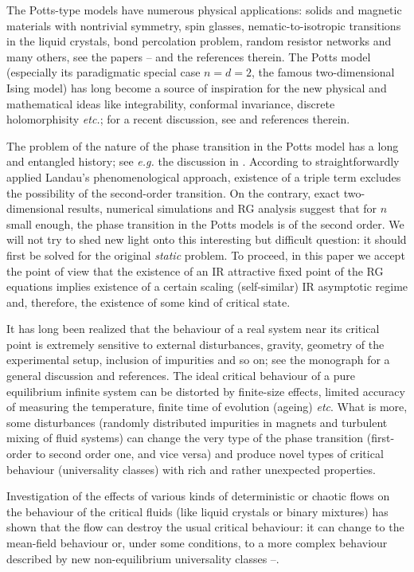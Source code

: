 \documentclass[12pt]{iopart}
\begin{document}
The Potts-type models have numerous physical applications: solids and
magnetic materials with nontrivial symmetry, spin glasses,
nematic-to-isotropic transitions in the liquid crystals, bond percolation
problem, random resistor networks and many others, see the papers
\cite{Golner}--\cite{Bonfim} and the references therein. The Potts model
(especially its paradigmatic special case $n=d=2$, the famous two-dimensional
Ising model) has long become a source of inspiration for the new physical and
mathematical ideas like integrability, conformal invariance, discrete
holomorphisity {\it etc.}; for a recent discussion, see \cite{VVV} and
references therein.

The problem of the nature of the phase transition in the Potts model has
a long and entangled history; see {\it e.g.} the discussion in \cite{Amit}.
According to straightforwardly applied Landau's phenomenological approach,
existence of a triple term excludes the possibility of the second-order
transition. On the contrary, exact two-dimensional results, numerical
simulations and RG analysis suggest that for $n$ small enough, the phase
transition in the Potts models is of the second order. We will not try to
shed new light onto this interesting but difficult question: it should first
be solved for the original {\it static} problem. To proceed, in this paper
we accept the point of view that the existence of an IR attractive fixed
point of the RG equations implies existence of a certain scaling
(self-similar) IR asymptotic regime and, therefore, the existence of some
kind of critical state.

It has long been realized that the behaviour of a real system near its
critical point is extremely sensitive to external disturbances, gravity,
geometry of the experimental setup, inclusion of impurities and so on;
see the monograph  \cite{Ivanov} for a general discussion and references.
The ideal critical behaviour of a pure equilibrium infinite system can be
distorted by finite-size effects, limited accuracy of measuring the
temperature, finite time of evolution (ageing) {\it etc}.
What is more, some disturbances (randomly distributed impurities in
magnets and turbulent mixing of fluid systems) can change the very type
of the phase transition (first-order to second order one, and vice versa)
and produce novel types of critical behaviour (universality classes) with
rich and rather unexpected properties.

Investigation of the effects of various kinds of deterministic or chaotic
flows on the behaviour of the critical fluids (like liquid crystals or
binary mixtures) has shown that the flow can destroy the usual critical
behaviour: it can change to the mean-field behaviour or, under some
conditions, to a more complex behaviour described by new non-equilibrium
universality classes \cite{Beysens}--\cite{Anipoz}.
\end{document}
